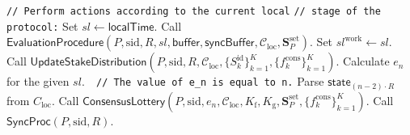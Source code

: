 \begin{protocol}
\begin{algorithmic}[1]
        \noindent
        \lstinline|// Perform actions according to the current local|
        \noindent
        \lstinline|// stage of the protocol:|
        \State Set $sl \leftarrow \textsf{localTime}$.
            \State Call $\textsf{EvaluationProcedure}(P, \text{sid}, R, sl, \textsf{buffer}, \textsf{syncBuffer}, \mathcal{C}_{\text{loc}}, \mathbf{S}_P^{\text{set}})$.
            \State Set $sl^{\text{work}} \leftarrow sl$.
                \State Call $\textsf{UpdateStakeDistribution}(P, \text{sid}, R, \mathcal{C}_{\text{loc}}, \{S_k^{\text{id}}\}_{k=1}^K, \{f^{\text{cons}}_k\}_{k=1}^K)$.
                \State Calculate $e_n$ for the given $sl$.\lstinline|  // The value of e_n is equal to n.|
                \State Parse $\textsf{state}_{(n - 2)\cdot R}$ from $C_{\text{loc}}$.
                    \State Call $\textsf{ConsensusLottery}(P, \text{sid}, e_n, \mathcal{C}_{\text{loc}}, K_{\text{f}}, K_{\text{g}},  \mathbf{S}_P^{\text{set}}, \{f^{\text{cons}}_k\}_{k=1}^K)$.
                \EndFor
                \State Call $\textsf{SyncProc}(P, \text{sid}, R)$.
            \EndIf
        \EndIf

    \end{algorithmic}\label{alg:main-ledger-protocol}
\end{protocol}
